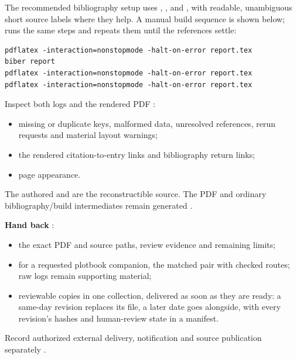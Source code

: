 The recommended bibliography setup uses , ,
 and , with readable, unambiguous short source
labels where they help. A manual build sequence is shown below;  runs the
same steps and repeats them until the references settle:
\begin{lstlisting}
pdflatex -interaction=nonstopmode -halt-on-error report.tex
biber report
pdflatex -interaction=nonstopmode -halt-on-error report.tex
pdflatex -interaction=nonstopmode -halt-on-error report.tex
\end{lstlisting}
Inspect both logs and the rendered PDF \cite[Bibliography and reader-verifiable
  pinpoints]{skill:report-production}:
\begin{itemize}
  \item missing or duplicate keys, malformed data, unresolved references, rerun requests and
        material layout warnings;
  \item the rendered citation-to-entry links and bibliography return links;
  \item page appearance.
\end{itemize}

The authored  and  are the reconstructible source. The PDF and
ordinary bibliography/build intermediates remain generated \cite[Acceptance checklist;
  Bibliography and reader-verifiable pinpoints]{skill:report-production}.

\textbf{Hand back} \cite[Review and release]{skill:report-production}:
\begin{itemize}
  \item the exact PDF and source paths, review evidence and remaining limits;
  \item for a requested plotbook companion, the matched pair with checked routes; raw logs remain
        supporting material;
  \item reviewable copies in one collection, delivered as soon as they are ready: a same-day
        revision replaces its file, a later date goes alongside, with every revision's hashes and
        human-review state in a manifest.
\end{itemize}


Record authorized external delivery, notification and source publication separately
\cite[Review and release]{skill:report-production}.
